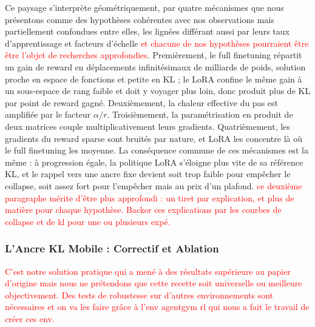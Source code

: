 \documentclass[11pt,a4paper]{article}
\begin{document}
Ce paysage s'interprète géométriquement, par quatre mécanismes que nous présentons comme des hypothèses cohérentes avec nos observations mais partiellement confondues entre elles, les lignées différant aussi par leurs taux d'apprentissage et facteurs d'échelle \textcolor{red}{et chacune de nos hypothèses pourraient être être l'objet de recherches approfondies}. Premièrement, le full finetuning répartit un gain de reward en déplacements infinitésimaux de milliards de poids, solution proche en espace de fonctions et petite en KL ; le LoRA confine le même gain à un sous-espace de rang faible et doit y voyager plus loin, donc produit plus de KL par point de reward gagné. Deuxièmement, la chaleur effective du pas est amplifiée par le facteur $\alpha / r$. Troisièmement, la paramétrisation en produit de deux matrices couple multiplicativement leurs gradients. Quatrièmement, les gradients du reward sparse sont bruités par nature, et LoRA les concentre là où le full finetuning les moyenne. La conséquence commune de ces mécanismes est la même : à progression égale, la politique LoRA s'éloigne plus vite de sa référence KL, et le rappel vers une ancre fixe devient soit trop faible pour empêcher le collapse, soit assez fort pour l'empêcher mais au prix d'un plafond.
\textcolor{red}{ce deuxième paragraphe mérite d'être plus approfondi : un tiret par explication, et plus de matière pour chaque hypothèse. Backer ces explications par les courbes de collapse et de kl pour une ou plusieurs expé.} 

\subsubsection{L'Ancre KL Mobile : Correctif et Ablation}

\textcolor{red}{C'est notre solution pratique qui a mené à des résultats supérieure au papier d'origine mais nous ne prétendons que cette recette soit universelle ou meilleure objectivement. Des tests de robustesse sur d'autres environnements sont nécessaires et on va les faire grâce à l'env agentgym rl qui nous a fait le travail de créer ces env.} 
\end{document}

